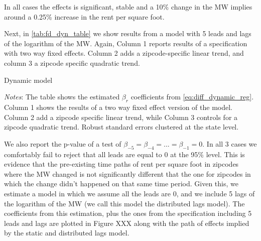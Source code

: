     
    In all cases the effects is significant, stable and a 10\% change in the MW implies around a 0.25\% increase in the rent per square foot. 
    
    Next, in \autoref{tab:fd_dyn_table} we show results from a model with 5 leads and lags of the logarithm of the MW. Again, Column 1 reports results of a specification with two way fixed effects. Column 2 adds a zipcode-specific linear trend, and column 3 a zipcode specific quadratic trend. 
    
    \begin{table}[h!] \centering
        \caption{Dynamic model}
        \label{tab:fd_dyn_table}
        \scalebox{0.85}{
        }
        \begin{minipage}{.95\textwidth} \footnotesize
			\vspace{3mm} 
			\textit{Notes}:  The table shows the estimated $\beta_{r}$ coefficients from \autoref{eq:diff_dynamic_reg}. Column 1 shows the results of a two way fixed effect version of the model. Column 2 add a zipcode specific linear trend, while Column 3 controls for a zipcode quadratic trend. Robust standard errors clustered at the state level.  
		\end{minipage}
    \end{table}
    
    We also report the p-value of a test of $\beta_{-5} = \beta_{-4} = ... = \beta_{-1} = 0$. In all 3 cases we comfortably fail to reject that all leads are equal to 0 at the 95\% level. This is evidence that the pre-existing time paths of rent per square foot in zipcodes where the MW changed is not significantly different that the one for zipcodes in which the change didn't happened on that same time period. Given this, we estimate a model in which we assume all the leads are 0, and we include 5 lags of the logarithm of the MW (we call this model the distributed lags model). The coefficients from this estimation, plus the ones from the specification including 5 leads and lags are plotted in Figure XXX along with the path of effects implied by the static and distributed lags model. 
    

